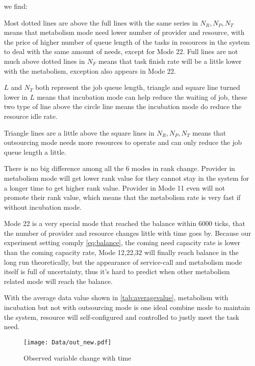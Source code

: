 we find: \begin{asparaenum}[1)]
\item Most dotted lines are above the full lines with the same series in $N_R,N_P,N_T$ means that metabolism mode need lower number of provider and resource, with the price of higher number of queue length of the tasks in resources in the system to deal with the same amount of needs, except for Mode 22. Full lines are not much above dotted lines in $N_F$ means that task finish rate will be a little lower with the metabolism, exception also appears in Mode 22.
\item $L$ and $N_T$ both represent the job queue length, triangle and square line turned lower in $L$ means that incubation mode can help reduce the waiting of job, these two type of line above the circle line means the incubation mode do reduce the resource idle rate.
\item Triangle lines are a little above the square lines in $N_R,N_P,N_T$ means that outsourcing mode needs more resources to operate and can only reduce the job queue length a little.
\item There is no big difference among all the 6 modes in rank change. Provider in metabolism mode will get lower rank value for they cannot stay in the system for a longer time to get higher rank value. Provider in Mode 11 even will not promote their rank value, which means that the metabolism rate is very fast if without incubation mode.
\item Mode 22 is a very special mode that reached the balance within 6000 ticks, that the number of provider and resource changes little with time goes by. Because our experiment setting comply \autoref{eq:balance}, the coming need capacity rate is lower than the coming capacity rate, Mode 12,22,32 will finally reach balance in the long run theoretically, but the appearance of service-call and metabolism mode itself is full of uncertainty, thus it's hard to predict when other metabolism related mode will reach the balance.
\item With the average data value shown in \autoref{tab:averagevalue}, metabolism with incubation but not with outsourcing mode is one ideal combine mode to maintain the system, resource will self-configured and controlled to justly meet the task need.
\end{asparaenum}
\begin{figure}[htbp]
    \centering
    \texttt{[image: Data/out\_new.pdf]}
    \caption{Observed variable change with time}
    \label{fig:out}
\end{figure}
